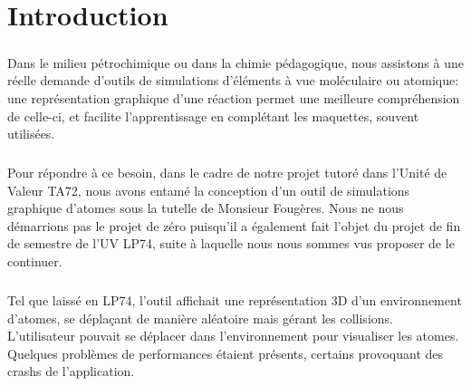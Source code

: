 \chapter*{Introduction}


\paragraph{}
Dans le milieu pétrochimique ou dans la chimie pédagogique, nous assistons à
une réelle demande d'outils de simulations d'éléments à vue moléculaire ou
atomique: une représentation graphique d'une réaction permet une meilleure
compréhension de celle-ci, et facilite l'apprentissage en complétant les
maquettes, souvent utilisées.

\paragraph{}
Pour répondre à ce besoin, dans le cadre de notre projet tutoré dans l'Unité de
Valeur TA72, nous avons entamé la conception d'un outil de simulations
graphique d'atomes sous la tutelle de Monsieur Fougères. Nous ne nous
démarrions pas le projet de zéro puisqu'il a également fait l'objet du projet
de fin de semestre de l'UV LP74, suite à laquelle nous nous sommes vus proposer
de le continuer.

\paragraph{}
Tel que laissé en LP74, l'outil affichait une représentation 3D d'un
environnement d'atomes, se déplaçant de manière aléatoire mais gérant les
collisions. L'utilisateur pouvait se déplacer dans l'environnement pour
visualiser les atomes. Quelques problèmes de performances étaient présents,
certains provoquant des crashs de l'application.

